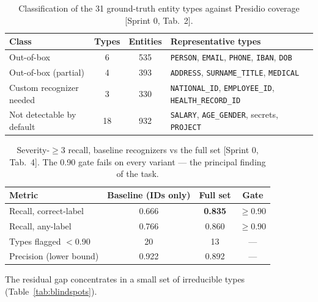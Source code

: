\documentclass[11pt,a4paper]{article}
\newcommand{\code}[1]{\texttt{\small #1}}
\newcommand{\src}[1]{{\footnotesize\textcolor{gray!55!black}{[#1]}}}
\begin{document}
\begin{table}[h]
\centering
\caption{Classification of the 31 ground-truth entity types against Presidio coverage \src{Sprint 0,
Tab.~2}.}
\label{tab:presclass}
\begin{tabular}{lccp{6.2cm}}
\toprule
\textbf{Class} & \textbf{Types} & \textbf{Entities} & \textbf{Representative types}\\
\midrule
Out-of-box & 6 & 535 & \code{PERSON}, \code{EMAIL}, \code{PHONE}, \code{IBAN}, \code{DOB}\\
Out-of-box (partial) & 4 & 393 & \code{ADDRESS}, \code{SURNAME\_TITLE}, \code{MEDICAL}\\
Custom recognizer needed & 3 & 330 & \code{NATIONAL\_ID}, \code{EMPLOYEE\_ID}, \code{HEALTH\_RECORD\_ID}\\
Not detectable by default & 18 & 932 & \code{SALARY}, \code{AGE\_GENDER}, secrets, \code{PROJECT}\\
\bottomrule
\end{tabular}
\end{table}

\begin{table}[h]
\centering
\caption{Severity-$\geq$3 recall, baseline recognizers vs the full set \src{Sprint 0, Tab.~4}. The 0.90
gate fails on every variant --- the principal finding of the task.}
\label{tab:presrecall}
\begin{tabular}{lccc}
\toprule
\textbf{Metric} & \textbf{Baseline (IDs only)} & \textbf{Full set} & \textbf{Gate}\\
\midrule
Recall, correct-label & 0.666 & \textbf{0.835} & $\geq$0.90\\
Recall, any-label & 0.766 & 0.860 & $\geq$0.90\\
Types flagged $<$0.90 & 20 & 13 & ---\\
Precision (lower bound) & 0.922 & 0.892 & ---\\
\bottomrule
\end{tabular}
\end{table}

The residual gap concentrates in a small set of irreducible types (Table~\ref{tab:blindspots}).
\end{document}
